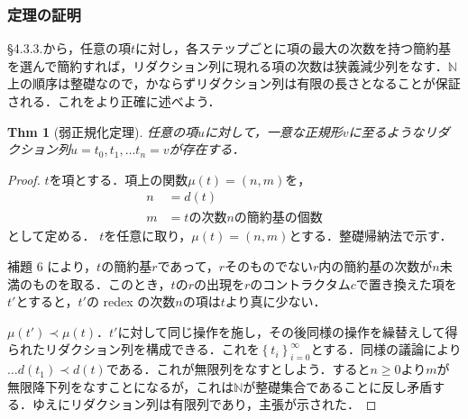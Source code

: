 \documentclass[a4paper,10pt,platex, dvipdfmx]{jsarticle}
\newtheorem{thm}{Thm}
\begin{document}
\subsubsection{定理の証明}
\S4.3.3.から，任意の項$t$に対し，各ステップごとに項の最大の次数を持つ簡約基を選んで簡約すれば，リダクション列に現れる項の次数は狭義減少列をなす．$\mathbb{N}$上の順序は整礎なので，かならずリダクション列は有限の長さとなることが保証される．これをより正確に述べよう．
\begin{thm}[弱正規化定理]
任意の項$u$に対して，一意な正規形$v$に至るようなリダクション列$u = t_{0},t_{1},\ldots t_{n} = v$が存在する．
\end{thm}
\begin{proof}
$t$を項とする．項上の関数$\mu(t) = \left(n, m\right)$を，\begin{align*}
n &= d(t)\\
m &=t\text{の次数}n\text{の簡約基の個数}
\end{align*}
として定める．
$t$を任意に取り，$\mu(t) =(n, m)$とする．整礎帰納法で示す．

補題 6 により，$t$の簡約基$r$であって，$r$そのものでない$r$内の簡約基の次数が$n$未満のものを取る．このとき，$t$の$r$の出現を$r$のコントラクタム$c$で置き換えた項を$t'$とすると，$t'$の redex の次数$n$の項は$t$より真に少ない．

$\mu(t') \prec \mu(t)$．$t'$に対して同じ操作を施し，その後同様の操作を繰替えして得られたリダクション列を構成できる．これを$\left\{t_{i}\right\}_{i = 0}^{\infty}$とする．同様の議論により$\ldots d(t_{1}) \prec d(t)$である．これが無限列をなすとしよう．すると$n \geq 0$より$m$が無限降下列をなすことになるが，これは$\mathbb{N}$が整礎集合であることに反し矛盾する．ゆえにリダクション列は有限列であり，主張が示された．
\end{proof}
\end{document}

